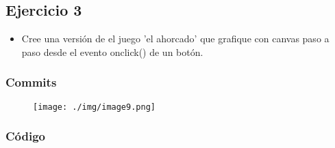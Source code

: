 \documentclass{article}
\begin{document}
\subsection{Ejercicio 3}
\begin{itemize}
\item{Cree una versión de el juego ’el ahorcado’ que grafique con canvas paso a paso
desde el evento onclick() de un botón.}
\end{itemize}
\subsubsection{Commits}
\begin{figure}[H]
    \centering
    \texttt{[image: ./img/image9.png]}
\end{figure}
\subsubsection{Código}
\end{document}
